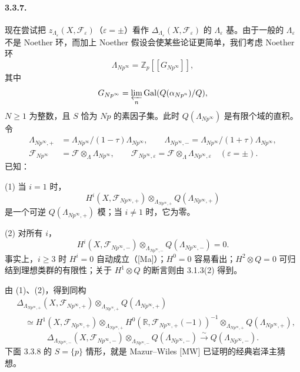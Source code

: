 \paragraph{3.3.7.} 现在尝试把 $z_{\Lambda_\varepsilon}(X,\mathcal F_\varepsilon)$（$\varepsilon=\pm$）看作 $\Delta_{\Lambda_\varepsilon}(X,\mathcal F_\varepsilon)$ 的 $\Lambda_\varepsilon$ 基。由于一般的 $\Lambda_\varepsilon$ 不是 Noether 环，而加上 Noether 假设会使某些论证更简单，我们考虑 Noether 环
\[
 \Lambda_{Np^\infty}=\mathbb Z_p[[G_{Np^\infty}]],
\]
其中
\[
 G_{Np^\infty}=\varprojlim_n\operatorname{Gal}(Q(\alpha_{Np^n})/Q),
\]
$N\ge1$ 为整数，且 $S$ 恰为 $Np$ 的素因子集。此时 $Q(\Lambda_{Np^\infty})$ 是有限个域的直积。令
\begin{align*}
 \Lambda_{Np^\infty,+}&=\Lambda_{Np^\infty}/(1-\tau)\Lambda_{Np^\infty},\qquad
 \Lambda_{Np^\infty,-}=\Lambda_{Np^\infty}/(1+\tau)\Lambda_{Np^\infty},\\
 \mathcal F_{Np^\infty}&=\mathcal F\otimes_\Lambda\Lambda_{Np^\infty},\qquad
 \mathcal F_{Np^\infty,\varepsilon}=\mathcal F\otimes_\Lambda\Lambda_{Np^\infty,\varepsilon}
 \quad(\varepsilon=\pm).
\end{align*}
已知：

\noindent(1) 当 $i=1$ 时，
\[
 H^i(X,\mathcal F_{Np^\infty,+})
 \otimes_{\Lambda_{Np^\infty,+}}Q(\Lambda_{Np^\infty,+})
\]
是一个可逆 $Q(\Lambda_{Np^\infty,+})$ 模；当 $i\ne1$ 时，它为零。

\noindent(2) 对所有 $i$，
\[
 H^i(X,\mathcal F_{Np^\infty,-})
 \otimes_{\Lambda_{Np^\infty,-}}Q(\Lambda_{Np^\infty,-})=0.
\]
事实上，$i\ge3$ 时 $H^i=0$ 自动成立（[Ma]）；$H^0=0$ 容易看出；$H^2\otimes Q=0$ 可归结到理想类群的有限性；关于 $H^1\otimes Q$ 的断言则由 3.1.3(2) 得到。

由 (1)、(2)，得到同构
\begin{equation*}\tag{3}
 \begin{aligned}
 &\Delta_{\Lambda_{Np^\infty,+}}(X,\mathcal F_{Np^\infty,+})
 \otimes_{\Lambda_{Np^\infty,+}}Q(\Lambda_{Np^\infty,+})\\
 &\quad\simeq H^1(X,\mathcal F_{Np^\infty,+})
 \otimes_{\Lambda_{Np^\infty,+}}H^0(\mathbb R,\mathcal F_{Np^\infty,+}(-1))^{-1}
 \otimes_{\Lambda_{Np^\infty,+}}Q(\Lambda_{Np^\infty,+}),
 \end{aligned}
\end{equation*}
\begin{equation*}\tag{4}
 \Delta_{\Lambda_{Np^\infty,-}}(X,\mathcal F_{Np^\infty,-})
 \otimes_{\Lambda_{Np^\infty,-}}Q(\Lambda_{Np^\infty,-})
 \xrightarrow{\sim}Q(\Lambda_{Np^\infty,-}).
\end{equation*}
下面 3.3.8 的 $S=\{p\}$ 情形，就是 Mazur--Wiles [MW] 已证明的经典岩泽主猜想。

